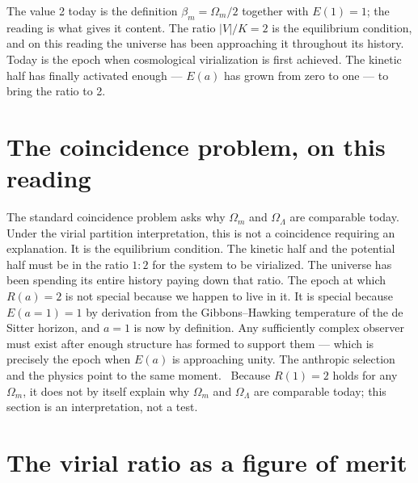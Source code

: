 The value 2 today is the definition $\beta_m=\Omega_m/2$ together with $E(1)=1$; the reading is what gives it content. The ratio $|V|/K=2$ is the
equilibrium condition, and on this reading the universe has been approaching it throughout its history. Today is the epoch when cosmological
virialization is first achieved. The kinetic half has finally activated enough --- $E(a)$ has grown from zero to one --- to bring the ratio to 2. \interp

\section{The coincidence problem, on this reading}\label{sec:vp_coincidence}
The standard coincidence problem asks why $\Omega_m$ and $\Omega_\Lambda$ are comparable today. Under the virial partition interpretation, this is not a
coincidence requiring an explanation. It is the equilibrium condition. The kinetic half and the potential half must be in the ratio $1:2$ for the system to
be virialized. The universe has been spending its entire history paying down that ratio. The epoch at which $R(a)=2$ is not special because we happen to
live in it. It is special because $E(a{=}1)=1$ by derivation from the Gibbons--Hawking temperature of the de Sitter horizon, and $a=1$ is now by
definition. Any sufficiently complex observer must exist after enough structure has formed to support them --- which is precisely the epoch when $E(a)$ is
approaching unity. The anthropic selection and the physics point to the same moment. \interp\ Because $R(1)=2$ holds for any $\Omega_m$, it does not by
itself explain why $\Omega_m$ and $\Omega_\Lambda$ are comparable today; this section is an interpretation, not a test.

\section{The virial ratio as a figure of merit}\label{sec:vp_merit}

